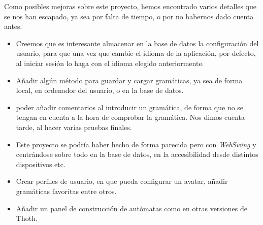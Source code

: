 Como posibles mejoras sobre este proyecto, hemos encontrado varios detalles que se nos han escapado, ya sea por falta de tiempo, o por no habernos dado cuenta antes.
\begin{itemize}
\item Creemos que es interesante almacenar en la base de datos la configuración del usuario, para que una vez que cambie el idioma de la aplicación, por defecto, al iniciar sesión lo haga con el idioma elegido anteriormente.

\item Añadir algún método para guardar y cargar gramáticas, ya sea de forma local, en ordenador del usuario, o en la base de datos.

\item poder añadir comentarios al introducir un gramática, de forma que no se tengan en cuenta a la hora de comprobar la gramática. Nos dimos cuenta tarde, al hacer varias pruebas finales.
\item Este proyecto se podría haber hecho de forma parecida pero con \emph{WebSwing} y centrándose sobre todo en la base de datos, en la accesibilidad desde distintos dispositivos etc.

\item Crear perfiles de usuario, en que pueda configurar un avatar, añadir gramáticas favoritas entre otros.

\item Añadir un panel de construcción de autómatas como en otras versiones de Thoth.
\end{itemize}
